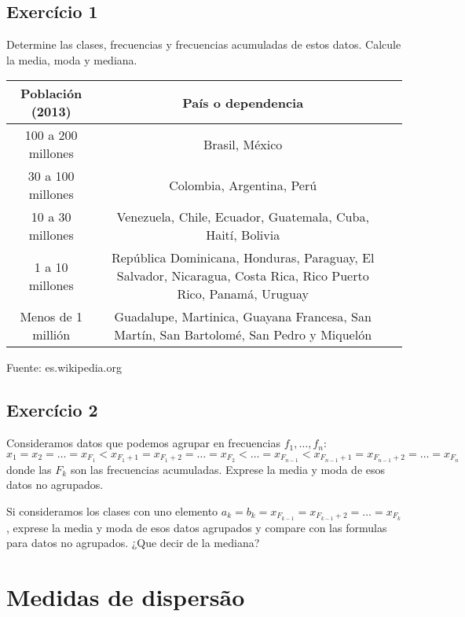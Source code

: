 \subsection*{Exercício 1}

Determine las clases, frecuencias y frecuencias acumuladas de estos datos.
Calcule la media, moda y mediana.

\begin{center}
\begin{tabular}{| c | c | c |}
  \hline
  Población (2013) & País o dependencia \\
  \hline
  100 a 200 millones & Brasil, México \\
  \hline
  30 a 100 millones &  Colombia, Argentina, Perú \\
  \hline
  10 a 30 millones & Venezuela, Chile, Ecuador, Guatemala,
  Cuba, Haití, Bolivia \\
  \hline
  1 a 10 millones & República Dominicana, Honduras, Paraguay, El Salvador,
  Nicaragua, Costa Rica, Rico Puerto Rico, Panamá, Uruguay \\
  \hline
  Menos de 1 millión & Guadalupe, Martinica, Guayana Francesa, San Martín,
  San Bartolomé, San Pedro y Miquelón \\
  \hline
\end{tabular}

Fuente: es.wikipedia.org
\end{center}

\subsection*{Exercício 2}

Consideramos datos que podemos agrupar en frecuencias $f_1, \ldots, f_n$:
$x_1 = x_2 = \ldots = x_{F_1} < x_{F_1+1} = x_{F_1+2} = \ldots = x_{F_2} < \ldots
= x_{F_{n-1}} < x_{F_{n-1}+1} = x_{F_{n-1}+2} = \ldots =
x_{F_{n}}$ donde las $F_k$ son las frecuencias acumuladas.
Exprese la media y moda de esos datos no agrupados.

Si consideramos los clases con uno elemento
$a_k = b_k = x_{F_{k-1}} = x_{F_{k-1}+2} = \ldots = x_{F_{k}}$, exprese
la media y moda de esos datos agrupados y compare con las formulas para
datos no agrupados. ¿Que decir de la mediana?

\section{Medidas de dispersão}

